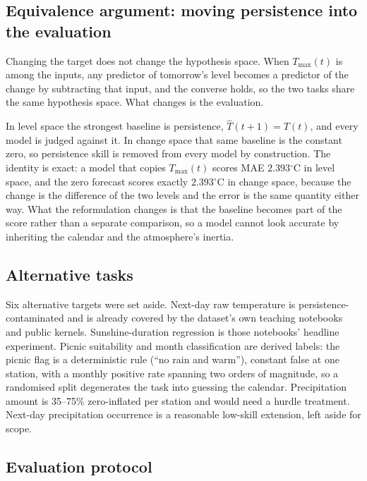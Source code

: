 \documentclass[11pt,a4paper]{article}
\newcommand{\tc}{\ensuremath{^{\circ}\mathrm{C}}}
\begin{document}
\subsection{Equivalence argument: moving persistence into the evaluation}
\label{sec:equivivalence}

Changing the target does not change the hypothesis space. When $T_{\max}(t)$ is among the inputs, any predictor of tomorrow's level becomes a predictor of the change by subtracting that input, and the converse holds, so the two tasks share the same hypothesis space. What changes is the evaluation.

In level space the strongest baseline is persistence, $\hat{T}(t{+}1) = T(t)$, and every model is judged against it. In change space that same baseline is the constant zero, so persistence skill is removed from every model by construction. The identity is exact: a model that copies $T_{\max}(t)$ scores MAE $2.393\tc$ in level space, and the zero forecast scores exactly $2.393\tc$ in change space, because the change is the difference of the two levels and the error is the same quantity either way. What the reformulation changes is that the baseline becomes part of the score rather than a separate comparison, so a model cannot look accurate by inheriting the calendar and the atmosphere's inertia.

\subsection{Alternative tasks}
\label{sec:rejected}

Six alternative targets were set aside. Next-day raw temperature is persistence-contaminated and is already covered by the dataset's own teaching notebooks and public kernels. Sunshine-duration regression is those notebooks' headline experiment. Picnic suitability and month classification are derived labels: the picnic flag is a deterministic rule (``no rain and warm''), constant false at one station, with a monthly positive rate spanning two orders of magnitude, so a randomised split degenerates the task into guessing the calendar. Precipitation amount is 35--75\% zero-inflated per station and would need a hurdle treatment. Next-day precipitation occurrence is a reasonable low-skill extension, left aside for scope.

\subsection{Evaluation protocol}
\label{sec:protocol}
\end{document}
